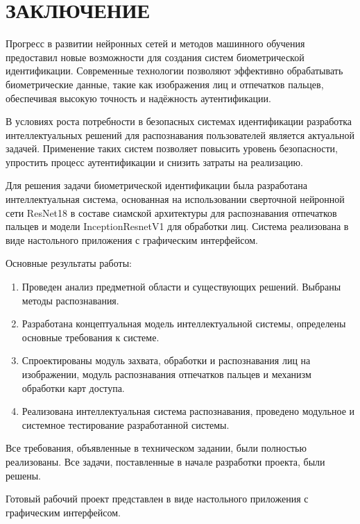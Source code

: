\section*{ЗАКЛЮЧЕНИЕ}

Прогресс в развитии нейронных сетей и методов машинного обучения предоставил новые возможности для создания систем биометрической идентификации. Современные технологии позволяют эффективно обрабатывать биометрические данные, такие как изображения лиц и отпечатков пальцев, обеспечивая высокую точность и надёжность аутентификации.

В условиях роста потребности в безопасных системах идентификации разработка интеллектуальных решений для распознавания пользователей является актуальной задачей. Применение таких систем позволяет повысить уровень безопасности, упростить процесс аутентификации и снизить затраты на реализацию.

Для решения задачи биометрической идентификации была разработана интеллектуальная система, основанная на использовании сверточной нейронной сети ResNet18 в составе сиамской архитектуры для распознавания отпечатков пальцев и модели InceptionResnetV1 для обработки лиц. Система реализована в виде настольного приложения с графическим интерфейсом.

Основные результаты работы:
\begin{enumerate}
	\item Проведен анализ предметной области и существующих решений. Выбраны методы распознавания.
	\item Разработана концептуальная модель интеллектуальной системы, определены основные требования к системе.
	\item Спроектированы модуль захвата, обработки и распознавания лиц на изображении, модуль распознавания отпечатков пальцев и механизм обработки карт доступа.
	\item Реализована интеллектуальная система распознавания, проведено модульное и системное тестирование разработанной системы.
\end{enumerate}

Все требования, объявленные в техническом задании, были полностью реализованы. Все задачи, поставленные в начале разработки проекта, были решены.

Готовый рабочий проект представлен в виде настольного приложения с графическим интерфейсом.